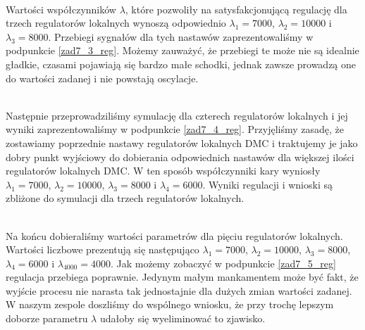 ~\\ Wartości współczynników $\lambda$, które pozwoliły na satysfakcjonującą regulację dla trzech regulatorów lokalnych wynoszą odpowiednio $\lambda_{\mathrm{1}} = 7000$, $\lambda_{\mathrm{2}} = 10000$ i $\lambda_{\mathrm{3}} = 8000$. Przebiegi sygnałów dla tych nastawów zaprezentowaliśmy w podpunkcie \ref{zad7_3_reg}. Możemy zauważyć, że przebiegi te może nie są idealnie gładkie, czasami pojawiają się bardzo małe schodki, jednak zawsze prowadzą one do wartości zadanej i nie powstają oscylacje. 

~\\ Następnie przeprowadziliśmy symulację dla czterech regulatorów lokalnych i jej wyniki zaprezentowaliśmy w podpunkcie \ref{zad7_4_reg}. Przyjęliśmy zasadę, że zostawiamy poprzednie nastawy regulatorów lokalnych DMC i traktujemy je jako dobry punkt wyjściowy do dobierania odpowiednich nastawów dla większej ilości regulatorów lokalnych DMC. W ten sposób współczynniki kary wyniosły $\lambda_{\mathrm{1}} = 7000$, $\lambda_{\mathrm{2}} = 10000$, $\lambda_{\mathrm{3}} = 8000$ i $\lambda_{\mathrm{4}} = 6000$. Wyniki regulacji i wnioski są zbliżone do symulacji dla trzech regulatorów lokalnych. 

~\\ Na końcu dobieraliśmy wartości parametrów dla pięciu regulatorów lokalnych. Wartości liczbowe prezentują się następująco $\lambda_{\mathrm{1}} = 7000$, $\lambda_{\mathrm{2}} = 10000$, $\lambda_{\mathrm{3}} = 8000$, $\lambda_{\mathrm{4}} = 6000$ i $\lambda_{\mathrm{4000}} = 4000$. Jak możemy zobaczyć w podpunkcie \ref{zad7_5_reg} regulacja przebiega poprawnie. Jedynym małym mankamentem może być fakt, że wyjście procesu nie narasta tak jednostajnie dla dużych zmian wartości zadanej. W naszym zespole doszliśmy do wspólnego wniosku, że przy trochę lepszym doborze parametru $\lambda$ udałoby się wyeliminować to zjawisko.

~\newpage 

